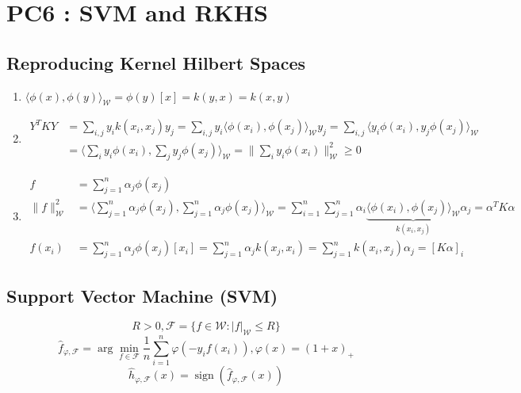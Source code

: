 \documentclass[10pt,a4paper,oneside]{article}
\newcommand{\argmin}{\arg\!\min}
\DeclareMathOperator{\sign}{sign}
\begin{document}
\newpage
\section{PC6 : SVM and RKHS}

\subsection{Reproducing Kernel Hilbert Spaces}

\begin{enumerate}
\item
$\langle \phi(x), \phi(y) \rangle_{\mathcal{W}} = \phi(y)[x] = k(y,x) = k(x,y)$

\item
\begin{align*}
Y^T K Y &= \sum_{i,j} y_i k(x_i,x_j) y_j = \sum_{i,j} y_i \langle \phi(x_i),\phi(x_j) \rangle_{\mathcal{W}} y_j = \sum_{i,j} \langle y_i \phi(x_i),y_j \phi(x_j) \rangle_{\mathcal{W}} \\
&= \langle \sum_{i} y_i \phi(x_i), \sum_{j} y_j \phi(x_j) \rangle_{\mathcal{W}} = \| \sum_{i} y_i \phi(x_i) \|^2_{\mathcal{W}} \geq 0
\end{align*}

\item
\begin{align*}
f &= \sum_{j = 1}^n \alpha_j \phi(x_j) \\
\| f \|^2_{\mathcal{W}} &= \langle \sum_{j = 1}^n \alpha_j \phi(x_j), \sum_{j = 1}^n \alpha_j \phi(x_j) \rangle_{\mathcal{W}} = \sum_{i = 1}^n \sum_{j = 1}^n \alpha_i \underbrace{\langle \phi(x_i), \phi(x_j) \rangle_\mathcal{W}}_{k(x_i,x_j)} \alpha_j = \alpha^T K \alpha \\
f(x_i) &= \sum_{j = 1}^n \alpha_j \phi(x_j) [x_i] = \sum_{j = 1}^n \alpha_j k(x_j,x_i) = \sum_{j = 1}^n k(x_i,x_j) \alpha_j = [K \alpha]_i
\end{align*}
\end{enumerate}

\subsection{Support Vector Machine (SVM)}

\[ R > 0, \mathcal{F} = \{ f \in \mathcal{W} : |f|_\mathcal{W} \leq R \} \]
\[ \hat{f}_{\varphi, \mathcal{F}} = \argmin_{f \in \mathcal{F}} \frac{1}{n} \sum_{i = 1}^n \varphi(-y_i f(x_i)), \varphi(x) = (1 + x)_+ \]
\[ \hat{h}_{\varphi, \mathcal{F}} (x) = \sign (\hat{f}_{\varphi, \mathcal{F}}(x)) \]
\end{document}
